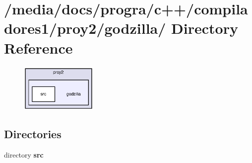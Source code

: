 \section{/media/docs/progra/c++/compiladores1/proy2/godzilla/ Directory Reference}
\label{dir_000006}


\begin{figure}[H]
\begin{center}
\leavevmode
\includegraphics[width=105pt]{dir_000006_dep}
\end{center}
\end{figure}
\subsection*{Directories}
\begin{CompactItemize}
\item 
directory {\bf src}
\end{CompactItemize}
